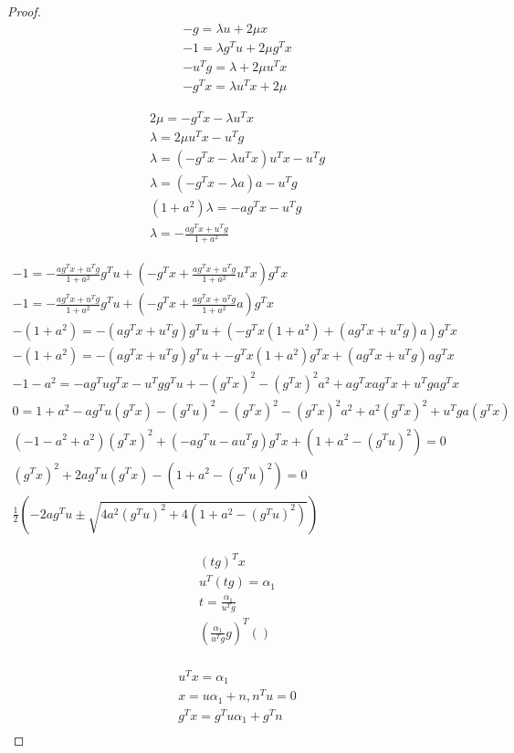\begin{proof}
\begin{align*}
-g = \lambda u + 2\mu x \\
-1 = \lambda g^Tu + 2\mu g^Tx \\
-u^Tg = \lambda + 2\mu u^Tx \\
-g^Tx = \lambda u^Tx + 2\mu
\end{align*}


\begin{align*}
2\mu = -g^Tx - \lambda u^Tx \\
\lambda = 2\mu u^Tx -u^Tg \\
\lambda = (-g^Tx - \lambda u^Tx) u^Tx -u^Tg \\
\lambda = (-g^Tx - \lambda a) a -u^Tg \\
(1 + a^2) \lambda = -ag^Tx -u^Tg \\
\lambda = -\frac{ag^Tx +u^Tg}{1 + a^2}
\end{align*}


\begin{align*}
-1 = -\frac{ag^Tx +u^Tg}{1 + a^2}g^Tu + (-g^Tx +\frac{ag^Tx +u^Tg}{1 + a^2} u^Tx)g^T x \\
-1 = -\frac{ag^Tx +u^Tg}{1 + a^2}g^Tu + (-g^Tx +\frac{ag^Tx +u^Tg}{1 + a^2} a)g^T x \\
-(1 + a^2) = -(ag^Tx +u^Tg)g^Tu + (-g^Tx(1 + a^2) +(ag^Tx +u^Tg) a)g^T x \\
-(1 + a^2) = -(ag^Tx +u^Tg)g^Tu + -g^Tx(1 + a^2)g^T x +(ag^Tx +u^Tg) ag^T x \\
-1 - a^2 = -ag^Tug^Tx -u^Tgg^Tu + -(g^Tx)^2 -(g^Tx)^2a^2 +ag^T xag^Tx +u^Tgag^T x  \\
0=1 + a^2 -ag^Tu(g^Tx) - (g^Tu)^2 -(g^Tx)^2 -(g^Tx)^2a^2 +a^2(g^T x)^2 +u^Tga(g^T x)  \\
(-1 -a^2 + a^2)(g^Tx)^2 + (-ag^Tu -au^Tg)g^Tx + (1 + a^2- (g^Tu)^2)= 0 \\
(g^Tx)^2 + 2ag^Tu(g^Tx) - (1 + a^2- (g^Tu)^2)= 0 \\
\frac{1}{2}\left(-2ag^Tu\pm\sqrt{4a^2(g^Tu)^2 + 4(1 + a^2- (g^Tu)^2)}\right)
\end{align*}


\begin{align*}
(tg)^Tx \\
u^T(tg) = \alpha_1 \\
t = \frac{\alpha_1}{u^Tg} \\
(\frac{\alpha_1}{u^Tg}g)^T() \\
\end{align*}


\begin{align*}
u^Tx = \alpha_1 \\
x = u\alpha_1 + n, n^Tu = 0 \\
g^Tx = g^Tu  \alpha_1 + g^Tn \\
\end{align*}


\end{proof}
